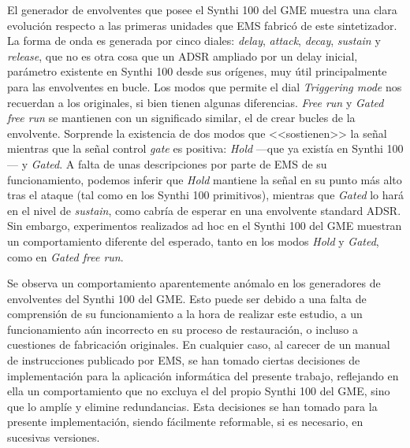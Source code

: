 El generador de envolventes que posee el Synthi 100 del GME muestra una clara evolución respecto a las primeras unidades que EMS fabricó de este sintetizador. La forma de onda es generada por cinco diales: \textit{delay}, \textit{attack}, \textit{decay}, \textit{sustain} y \textit{release}, que no es otra cosa que un ADSR ampliado por un delay inicial, parámetro existente en Synthi 100 desde sus orígenes, muy útil principalmente para las envolventes en bucle. Los modos que permite el dial \textit{Triggering mode} nos recuerdan a los originales, si bien tienen algunas diferencias. \textit{Free run} y \textit{Gated free run} se mantienen con un significado similar, el de crear bucles de la envolvente. Sorprende la existencia de dos modos que <<sostienen>> la señal mientras que la señal control \textit{gate} es positiva: \textit{Hold} ---que ya existía en Synthi 100--- y \textit{Gated}. A falta de unas descripciones por parte de EMS de su funcionamiento, podemos inferir que \textit{Hold} mantiene la señal en su punto más alto tras el ataque (tal como en los Synthi 100 primitivos), mientras que \textit{Gated} lo hará en el nivel de \textit{sustain}, como cabría de esperar en una envolvente standard ADSR. Sin embargo, experimentos realizados ad hoc en el Synthi 100 del GME muestran un comportamiento diferente del esperado, tanto en los modos \textit{Hold} y \textit{Gated}, como en \textit{Gated free run}.

Se observa un comportamiento aparentemente anómalo en los generadores de envolventes del Synthi 100 del GME. Esto puede ser debido a una falta de comprensión de su funcionamiento a la hora de realizar este estudio, a un funcionamiento aún incorrecto en su proceso de restauración, o incluso a cuestiones de fabricación originales. En cualquier caso, al carecer de un manual de instrucciones publicado por EMS, se han tomado ciertas decisiones de implementación para la aplicación informática del presente trabajo, reflejando en ella un comportamiento que no excluya el del propio Synthi 100 del GME, sino que lo amplíe y elimine redundancias. Esta decisiones se han tomado para la presente implementación, siendo fácilmente reformable, si es necesario, en sucesivas versiones.

